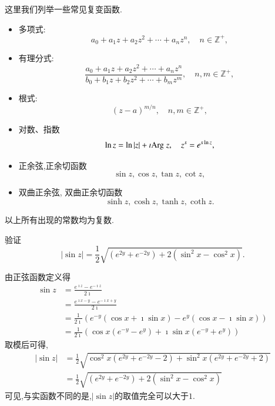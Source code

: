 这里我们列举一些常见复变函数.
\begin{itemize}
    \item 多项式:
        \begin{equation}
            a_0 + a_1 z + a_2 z^2 + \cdots + a_n z^n , \quad n\in \mathbb{Z}^+ ,
        \end{equation}
    \item 有理分式:       
         \begin{equation}
        \frac{a_0 + a_1 z + a_2 z^2 + \cdots + a_n z^n}{{b_0 + b_1 z + b_2 z^2 + \cdots + b_m z^m}} , \quad  n,m\in \mathbb{Z}^+ ,
        \end{equation}
    \item 根式:
        \begin{equation}
            (z-a)^{m/n} , \quad  n,m\in \mathbb{Z}^+ ,
        \end{equation}
    \item 对数、指数
        \begin{equation}
            \ln z = \ln |z| + \imath {\mathrm{Arg}\;} z, \quad z^s = e^{s\ln z} ,
        \end{equation}
    \item 正余弦,正余切函数 
        \begin{equation}
            \sin z , \cos z , \tan z, \cot z ,
        \end{equation}
    \item 双曲正余弦, 双曲正余切函数
        \begin{equation}
            \sinh z , \cosh z , \tanh z, \coth z  .
        \end{equation}
\end{itemize}
以上所有出现的常数均为复数.

\begin{example}
验证\[
    |\sin z|=\frac{1}{2} \sqrt{\left(e^{2 y}+e^{-2 y}\right)+2\left(\sin ^2 x-\cos ^2 x\right)} .
    \]
\end{example}
\begin{solution}
    由正弦函数定义得
    \begin{align*}
        \sin z &= \frac{e^{\imath z} - e^{-\imath z}}{2\imath} 
        \\ 
        & = \frac{e^{\imath x - y} - e^{-\imath x + y}}{2\imath}
        \\
        & = \frac{1}{2\imath}\left( e^{-y} (\cos x + \imath \sin x ) - e^{y} (\cos x - \imath \sin x ) \right) 
        \\
        & = \frac{1}{2\imath} \left( \cos x (e^{-y} - e^{y}) + \imath \sin x (e^{-y} + e^{y}) \right)
    \end{align*}
    取模后可得,
    \begin{align*}
        |\sin z | &= \frac{1}{2}\sqrt{ \cos^2x (e^{2y} + e^{-2y} -2) + \sin^2 x (e^{2y} + e^{-2y} +2) }
        \\
        &=\frac{1}{2}\sqrt{\left(e^{2 y}+e^{-2 y}\right)+2\left(\sin ^2 x-\cos ^2 x\right)}
    \end{align*}
    可见,与实函数不同的是,$|\sin z|$的取值完全可以大于$1$.
\end{solution}


